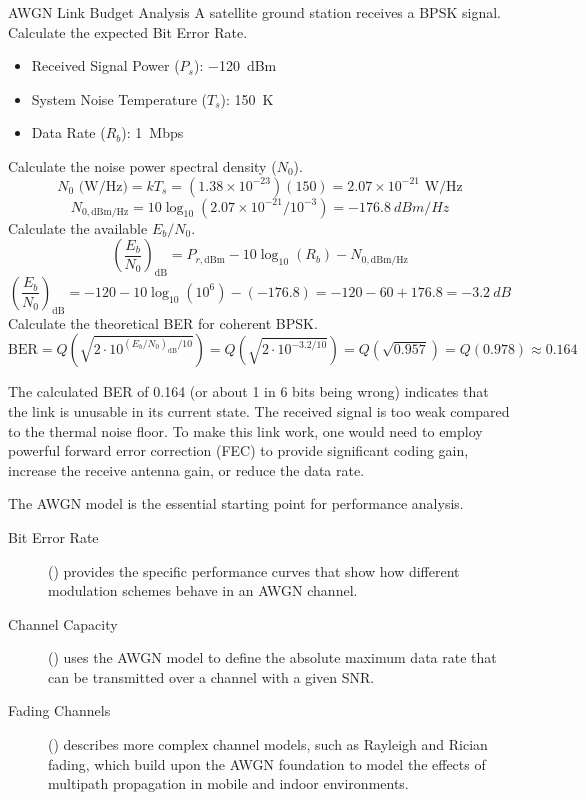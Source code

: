 \begin{workedexample}{AWGN Link Budget Analysis}
     A satellite ground station receives a BPSK signal. Calculate the expected Bit Error Rate.
    \begin{itemize}
        \item Received Signal Power ($P_s$): \qty{-120}{dBm}
        \item System Noise Temperature ($T_s$): \qty{150}{K}
        \item Data Rate ($R_b$): \qty{1}{Mbps}
    \end{itemize}
    \begin{derivationsteps}
        \step Calculate the noise power spectral density ($N_0$).
        \[ N_0 \text{ (W/Hz)} = kT_s = (1.38 \times 10^{-23})(150) = 2.07 \times 10^{-21} \text{ W/Hz} \]
        \[ N_{0, \text{dBm/Hz}} = 10\log_{10}(2.07 \times 10^{-21} / 10^{-3}) = \qty{-176.8}{dBm/Hz} \]
        \step Calculate the available $E_b/N_0$.
        \[ \left(\frac{E_b}{N_0}\right)_{\text{dB}} = P_{r, \text{dBm}} - 10\log_{10}(R_b) - N_{0, \text{dBm/Hz}} \]
        \[ \left(\frac{E_b}{N_0}\right)_{\text{dB}} = -120 - 10\log_{10}(10^6) - (-176.8) = -120 - 60 + 176.8 = \qty{-3.2}{dB} \]
        \step Calculate the theoretical BER for coherent BPSK.
        \[ \text{BER} = Q\left(\sqrt{2 \cdot 10^{(E_b/N_0)_{\text{dB}}/10}}\right) = Q\left(\sqrt{2 \cdot 10^{-3.2/10}}\right) = Q(\sqrt{0.957}) = Q(0.978) \approx 0.164 \]
    \end{derivationsteps}
     The calculated BER of 0.164 (or about 1 in 6 bits being wrong) indicates that the link is unusable in its current state. The received signal is too weak compared to the thermal noise floor. To make this link work, one would need to employ powerful forward error correction (FEC) to provide significant coding gain, increase the receive antenna gain, or reduce the data rate.
\end{workedexample}


\begin{importantbox}[title={Further Reading}]
    The AWGN model is the essential starting point for performance analysis.
    \begin{description}
        \item[Bit Error Rate] () provides the specific performance curves that show how different modulation schemes behave in an AWGN channel.
        \item[Channel Capacity] () uses the AWGN model to define the absolute maximum data rate that can be transmitted over a channel with a given SNR.
        \item[Fading Channels] () describes more complex channel models, such as Rayleigh and Rician fading, which build upon the AWGN foundation to model the effects of multipath propagation in mobile and indoor environments.
    \end{description}
\end{importantbox}

